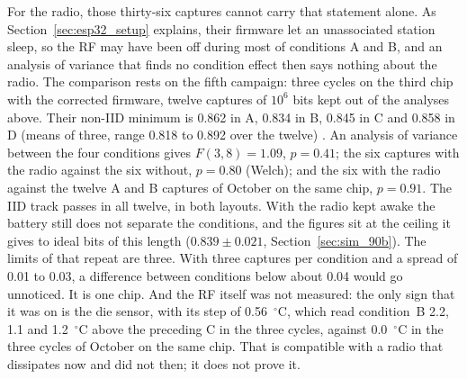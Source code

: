 For the radio, those thirty-six captures cannot carry that statement
alone. As Section~\ref{sec:esp32_setup} explains, their firmware let an
unassociated station sleep, so the RF may have been off during most of
conditions A and B, and an analysis of variance that finds no condition
effect then says nothing about the radio. The comparison rests on the
fifth campaign: three cycles on the third chip with the corrected
firmware, twelve captures of $10^6$ bits kept out of the analyses above.
Their non-IID minimum is 0.862 in A, 0.834 in B, 0.845 in C and 0.858 in
D (means of three, range 0.818 to 0.892 over the twelve) \meas{}. An
analysis of variance between the four conditions gives $F(3, 8) = 1.09$,
$p = 0.41$; the six captures with the radio against the six without,
$p = 0.80$ (Welch); and the six with the radio against the twelve A and
B captures of October on the same chip, $p = 0.91$. The IID track passes
in all twelve, in both layouts. With the radio kept awake the battery
still does not separate the conditions, and the figures sit at the
ceiling it gives to ideal bits of this length ($0.839 \pm 0.021$,
Section~\ref{sec:sim_90b}). The limits of that repeat are three. With
three captures per condition and a spread of 0.01 to 0.03, a difference
between conditions below about 0.04 would go unnoticed. It is one chip.
And the RF itself was not measured: the only sign that it was on is the
die sensor, with its step of 0.56~$^\circ$C, which read condition~B 2.2,
1.1 and 1.2~$^\circ$C above the preceding C in the three cycles, against
0.0~$^\circ$C in the three cycles of October on the same chip. That is
compatible with a radio that dissipates now and did not then; it does
not prove it.

